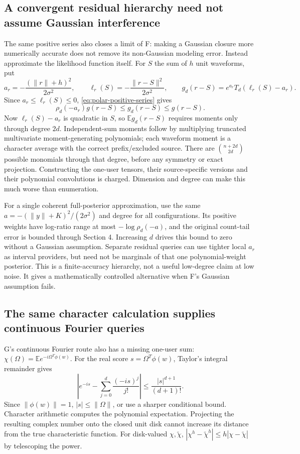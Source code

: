 \documentclass[10pt,a4paper]{article}
\newcommand{\E}{\mathbb E}
\begin{document}
\subsection{A convergent residual hierarchy need not assume Gaussian interference}
The same positive series also closes a limit of F: making a Gaussian closure more numerically accurate
does not remove its non-Gaussian modeling error. Instead approximate the likelihood function itself.
For $S$ the sum of $h$ unit waveforms, put
\[
 a_r=-\frac{(\|r\|+h)^2}{2\sigma^2},\qquad
 \ell_r(S)=-\frac{\|r-S\|^2}{2\sigma^2},\qquad
 g_d(r-S)=e^{a_r}T_d(\ell_r(S)-a_r).
\]
Since $a_r\leq\ell_r(S)\leq0$, \eqref{eq:polar-positive-series} gives
\[
 \rho_d(-a_r)g(r-S)\leq g_d(r-S)\leq g(r-S).
\]
Now $\ell_r(S)-a_r$ is quadratic in $S$, so $\E g_d(r-S)$ requires moments only through degree $2d$.
Independent-sum moments follow by multiplying truncated multivariate moment-generating polynomials;
each waveform moment is a character average with the correct prefix/excluded source.
There are $\binom{n+2d}{2d}$ possible monomials through that degree, before any symmetry or exact projection.
Constructing the one-user tensors, their source-specific versions and their polynomial convolutions is
charged. Dimension and degree can make this much worse than enumeration.

For a single coherent full-posterior approximation, use the same
$a=-(\|y\|+K)^2/(2\sigma^2)$ and degree for all configurations.
Its positive weights have log-ratio range at most $-\log\rho_d(-a)$, and the original count-tail error
is bounded through Section 4. Increasing $d$ drives this bound to zero without a Gaussian assumption.
Separate residual queries can use tighter local $a_r$ as interval providers, but need not be marginals
of that one polynomial-weight posterior. This is a finite-accuracy hierarchy, not a useful low-degree
claim at low noise. It gives a mathematically controlled alternative when F's Gaussian assumption fails.

\subsection{The same character calculation supplies continuous Fourier queries}
G's continuous Fourier route also has a missing one-user sum:
$\chi(\Omega)=\E e^{-i\Omega^T\phi(w)}$.
For the real score $s=\Omega^T\phi(w)$, Taylor's integral remainder gives
\[
 \left|e^{-is}-\sum_{j=0}^d\frac{(-is)^j}{j!}\right|
 \leq\frac{|s|^{d+1}}{(d+1)!}.
\]
Since $\|\phi(w)\|=1$, $|s|\leq\|\Omega\|$, or use a sharper conditional bound.
Character arithmetic computes the polynomial expectation. Projecting the resulting complex number onto
the closed unit disk cannot increase its distance from the true characteristic function.
For disk-valued $\chi,\widetilde\chi$,
$|\chi^h-\widetilde\chi^h|\leq h|\chi-\widetilde\chi|$ by telescoping the power.
\end{document}
